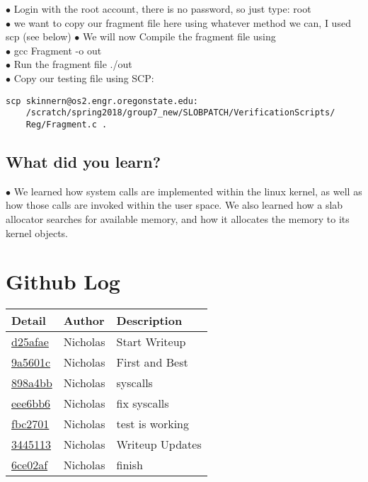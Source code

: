 \documentclass[letterpaper,10pt,fleqn,draftclsnofoot,onecolumn]{IEEEtran}
\begin{document}
	$\bullet$ Login with the root account, there is no password, so just type: root\\
	$\bullet$ we want to copy our fragment file here using whatever method we can, I used scp (see below)
	$\bullet$ We will now Compile the fragment file using\\
	$\bullet$ gcc Fragment -o out\\
	$\bullet$ Run the fragment file ./out\\
	$\bullet$ Copy our testing file using SCP: \begin{verbatim}scp skinnern@os2.engr.oregonstate.edu:
	/scratch/spring2018/group7_new/SLOBPATCH/VerificationScripts/
	Reg/Fragment.c . \end{verbatim}

	\subsection{What did you learn?}
	$\bullet$ We learned how system calls are implemented within the linux kernel, as well as how those calls are invoked within the user space. We also learned how a slab allocator searches for available memory, and how it allocates the memory to its kernel objects.

	\section*{ Github Log }
	\begin{tabular}{l l p{1.5in}}\textbf{Detail} & \textbf{Author} & \textbf{Description}\\\hline
		\href{https://github.com/Skinnern/CS444/commit/d25afae5ff871e6525947472b1037c35a23dbf66}{d25afae} & Nicholas & Start Writeup\\\hline
		\href{https://github.com/Skinnern/CS444/commit/9a5601c278df3c643fa2316371fe2b797e57e5d5}{9a5601c} & Nicholas & First and Best\\\hline
		\href{https://github.com/Skinnern/CS444/commit/898a4bb59e66615d72b66c95f851c75e738dfb82}{898a4bb} & Nicholas & syscalls\\\hline
		\href{https://github.com/Skinnern/CS444/commit/eee6bb6402b1f34a0f840024fe803216cd9cc163}{eee6bb6} & Nicholas & fix syscalls\\\hline
		\href{https://github.com/Skinnern/CS444/commit/fbc270174b2ce3756389909b5256367227706fa9}{fbc2701} & Nicholas & test is working\\\hline
		
		\href{https://github.com/Skinnern/CS444/commit/344511386bc26db747042fb171bd17a31a7e0784}{3445113} & Nicholas & Writeup Updates\\\hline
		
		\href{https://github.com/Skinnern/CS444/commit/6ce02af9c650f3528ad7bf0778dd6474aec80ea5}{6ce02af} & Nicholas & finish\\\hline
		
		
	\end{tabular}
	
\end{document}
